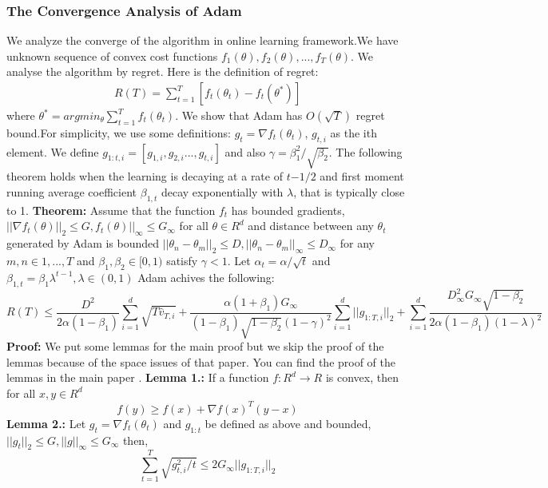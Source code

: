\documentclass[10pt]{article}
\begin{document}
\subsubsection{The Convergence Analysis of Adam}
We analyze the converge of the algorithm in online learning framework.We have unknown sequence of convex cost functions $f_1(\theta), f_2(\theta),...,f_T(\theta)$. We analyse the algorithm by regret. Here is the definition of regret:
\begin{align}
R(T) = \sum_{t=1}^{T}[f_t(\theta_t)	- f_t(\theta^*)]
\label{regret}
\end{align}
where $\theta^* = argmin_{\theta} \sum_{t=1}^{T} f_t(\theta_t)$. We show that Adam has $O(\sqrt{T} )$ regret bound.For simplicity, we use some definitions: $g_t = \nabla f_t(\theta_t)$, $g_{t,i}$ as the ith element. We define $g_{1:t,i} = [g_{1,i},g_{2,i}..., g_{t,i} ]$ and also $\gamma = \beta_1^2/\sqrt{\beta_2}$. The following theorem holds when the learning is decaying at a rate of $t{-1/2}$ and first moment running average coefficient $\beta_{1,t}$ decay exponentially with $\lambda$, that is typically close to 1.\newline
\textbf{Theorem:} Assume that the function $f_t$ has bounded gradients, $||\nabla f_t(\theta)||_2 \leq G ,  f_t(\theta)||_{\infty} \leq G_{\infty}$ for all $\theta \in R^d$ and distance between any $\theta_t$ generated by Adam is bounded $||\theta_n - \theta_m||_2 \leq D,  ||\theta_n - \theta_m||_\infty \leq D_\infty$ for any $m,n \in {1,...,T}$ and $\beta_1 , \beta_2 \in [0,1)$ satisfy $\gamma < 1 $. Let $\alpha_t = \alpha/\sqrt{t}$ and $\beta_{1,t} = \beta_1\lambda^{t-1}, \lambda \in (0,1)$ Adam achives the following: $$
R(T) \leq \frac{D^2}{2 \alpha (1-\beta_1)} \sum_{i=1}^d \sqrt{T \hat{v}_{T,i}} + \frac{\alpha(1 + \beta_1) G_\infty}{(1-\beta_1) \sqrt{1-\beta_2}(1-\gamma)^2} \sum_{i=1}^d ||g_{1:T,i} ||_2 + \sum_{i=1}^d \frac{D^2_\infty G_\infty \sqrt{1-\beta_2}}{2\alpha(1-\beta_1)(1-\lambda)^2}$$
\textbf{Proof:} We put some lemmas for the main proof but we skip the proof of the lemmas because of the space issues of that paper. You can find the proof of the lemmas in the main paper \cite{Adam}. \newline
\textbf{Lemma 1.:} If a function $f: R^d \rightarrow R$ is convex, then for all $x,y \in R^d$
$$ f(y) \geq f(x) + \nabla f(x)^T(y-x) $$
\textbf{Lemma 2.:} Let $g_t = \nabla f_t(\theta_t)$ and $g_{1:t}$ be defined as above and bounded, $||g_t||_2 \leq G, ||g||_\infty \leq G_\infty$ then,
$$ \sum_{t=1}^T \sqrt{g^2_{t,i}/t} \leq 2G_\infty||g_{1:T,i} ||_2$$
\end{document}
